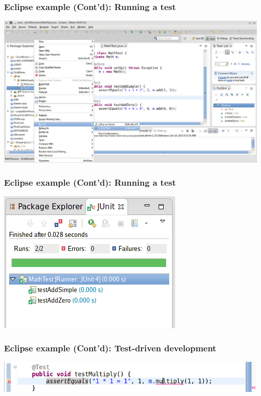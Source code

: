 \documentclass{beamer}
\begin{document}
\begin{frame}
\frametitle{Eclipse example (Cont'd): Running a test}
\label{sec-18}

\includegraphics[width=.5\textwidth]{./eclipse-junit-07-run.png}
\end{frame}
\begin{frame}
\frametitle{Eclipse example (Cont'd): Running a test}
\label{sec-19}

\includegraphics[width=\textwidth]{./eclipse-junit-08-success.png}
\end{frame}
\begin{frame}
\frametitle{Eclipse example (Cont'd): Test-driven development}
\label{sec-20}

\includegraphics[width=\textwidth]{./eclipse-junit-09-tdd-test-first.png}
\end{frame}
\end{document}
